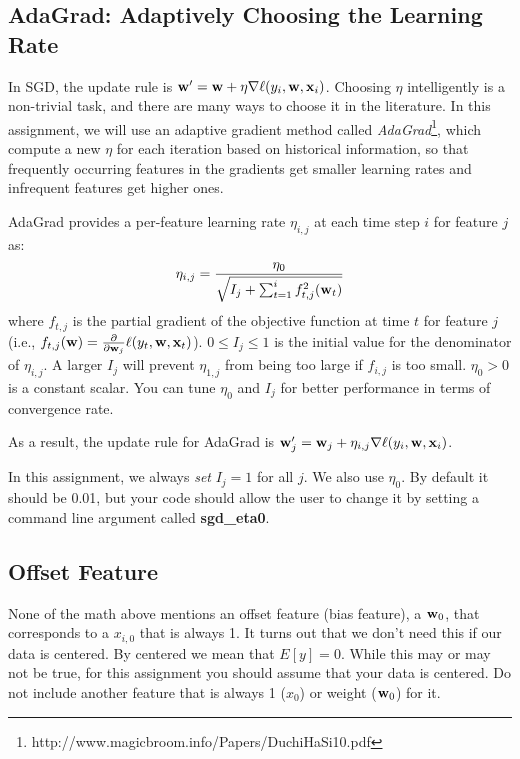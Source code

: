 \documentclass[11pt]{article}
\newcommand{\vw}{{\bf w}}
\newcommand{\vx}{{\bf x}}
\newcommand{\vxi}{{\bf x}_i}
\begin{document}
\subsection{AdaGrad: Adaptively Choosing the Learning Rate}
In SGD, the update rule is $\vw' = \vw + \eta \nabla \ell(y_i, \vw, \vxi)$. Choosing $\eta$ intelligently is a non-trivial task, and there are many ways to choose it in the literature. In this assignment, we will use an adaptive gradient method called \textit{AdaGrad}\footnote{http://www.magicbroom.info/Papers/DuchiHaSi10.pdf}, which compute a new $\eta$ for each iteration based on historical  information, so that frequently occurring features in the gradients get smaller learning rates and infrequent features get higher ones. 

AdaGrad provides a per-feature learning rate $\eta_{i,j}$ at each time step $i$ for feature $j$ as:
\begin{align}
\eta_{i,j}=\frac{\eta_0}{\sqrt{I_j+\sum_{t=1}^i f_{t,j}^2(\vw_t)}}
\end{align}
where $f_{t,j}$ is the partial gradient of the objective function at time $t$ for feature $j$ (i.e., $f_{t,j}(\vw)=\frac{\partial}{\partial \vw_j} \ell(y_t, \vw, \vx_t)$). $0 \le I_j \le 1$ is the initial value for the denominator of $\eta_{i,j}$. A larger $I_j$ will prevent $\eta_{1,j}$ from being too large if $f_{i,j}$ is too small. $\eta_0>0$ is a constant scalar.
You can tune $\eta_0$ and $I_j$ for better performance in terms of convergence rate. 

As a result, the update rule for AdaGrad is $\vw_j' = \vw_j + \eta_{i,j} \nabla \ell(y_i, \vw, \vxi)$.

In this assignment, we always \emph{set} $I_j=1$ for all $j$. We also use $\eta_0$. By default it should be 0.01, but your code should allow the user to change it by setting a command line argument called \textbf{sgd\_eta0}.



\subsection{Offset Feature}
None of the math above mentions an offset feature (bias feature), a $\vw_0$, that corresponds to a $x_{i,0}$ that is always 1. It turns out that we don't need this if our data is centered. By centered we mean that $E[y] = 0$. While this may or may not be true, for this assignment you should assume that your data is centered. Do not include another feature that is always 1 ($x_0$) or weight ($\vw_0$) for it.
\end{document}
